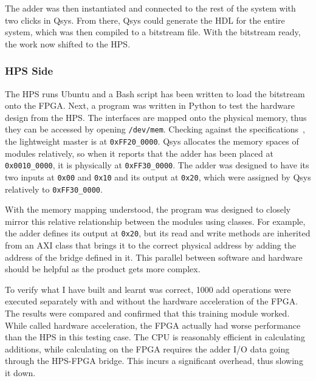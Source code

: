 The adder was then instantiated and connected to the rest of the system with
two clicks in Qsys.
From there, Qsys could generate the HDL for the entire system, which was then
compiled to a bitstream file.
With the bitstream ready, the work now shifted to the HPS.

\subsubsection{\textbf{HPS Side}}
The HPS runs Ubuntu and a Bash script has been written to load the bitstream
onto the FPGA.
Next, a program was written in Python to test the hardware design from the HPS.
The interfaces are mapped onto the physical memory, thus they can be accessed
by opening \texttt{/dev/mem}.
Checking against the specifications~\cite{Altera6}, the lightweight master is
at \texttt{0xFF20\_0000}.
Qsys allocates the memory spaces of modules relatively, so when it reports
that the adder has been placed at \texttt{0x0010\_0000}, it is physically at
\texttt{0xFF30\_0000}.
The adder was designed to have its two inputs at \texttt{0x00} and
\texttt{0x10} and its output at \texttt{0x20}, which were assigned by Qsys
relatively to \texttt{0xFF30\_0000}.

With the memory mapping understood, the program was designed to closely
mirror this relative relationship between the modules using classes.
For example, the adder defines its output at \texttt{0x20}, but its read and
write methods are inherited from an AXI class that brings it to the
correct physical address by adding the address of the bridge defined in it.
This parallel between software and hardware should be helpful as the product
gets more complex.

To verify what I have built and learnt was correct, 1000 add operations were
executed separately with and without the hardware acceleration of the FPGA.
The results were compared and confirmed that this training module worked.
While called hardware acceleration, the FPGA actually had worse performance
than the HPS in this testing case.
The CPU is reasonably efficient in calculating additions, while calculating
on the FPGA requires the adder I/O data going through the HPS-FPGA bridge.
This incurs a significant overhead, thus slowing it down.

